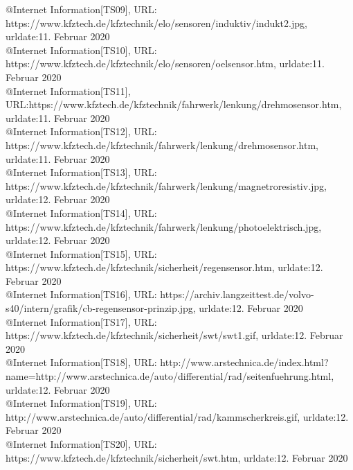 @Internet{ Information[TS09],
	URL: https://www.kfztech.de/kfztechnik/elo/sensoren/induktiv/indukt2.jpg,
	urldate:11. Februar 2020}
\\

@Internet{ Information[TS10],
	URL: https://www.kfztech.de/kfztechnik/elo/sensoren/oelsensor.htm,
	urldate:11. Februar 2020}
\\

@Internet{ Information[TS11],
	URL:https://www.kfztech.de/kfztechnik/fahrwerk/lenkung/drehmosensor.htm,
	urldate:11. Februar 2020}
\\

@Internet{ Information[TS12],
	URL: https://www.kfztech.de/kfztechnik/fahrwerk/lenkung/drehmosensor.htm,
	urldate:11. Februar 2020}
\\

@Internet{ Information[TS13],
	URL: https://www.kfztech.de/kfztechnik/fahrwerk/lenkung/magnetroresistiv.jpg,
	urldate:12. Februar 2020}
\\

@Internet{ Information[TS14],
	URL: https://www.kfztech.de/kfztechnik/fahrwerk/lenkung/photoelektrisch.jpg,
	urldate:12. Februar 2020}
\\

@Internet{ Information[TS15],
	URL: https://www.kfztech.de/kfztechnik/sicherheit/regensensor.htm,
	urldate:12. Februar 2020}
\\

@Internet{ Information[TS16],
	URL: https://archiv.langzeittest.de/volvo-s40/intern/grafik/cb-regensensor-prinzip.jpg,
	urldate:12. Februar 2020}
\\

@Internet{ Information[TS17],
	URL: https://www.kfztech.de/kfztechnik/sicherheit/swt/swt1.gif,
	urldate:12. Februar 2020}
\\

@Internet{ Information[TS18],
	URL: http://www.arstechnica.de/index.html?name=http://www.arstechnica.de/auto/differential/rad/seitenfuehrung.html, 
	urldate:12. Februar 2020}
\\

@Internet{ Information[TS19],
	URL: http://www.arstechnica.de/auto/differential/rad/kammscherkreis.gif,
	urldate:12. Februar 2020}
\\

@Internet{ Information[TS20],
	URL: https://www.kfztech.de/kfztechnik/sicherheit/swt.htm,
	urldate:12. Februar 2020}
\\

